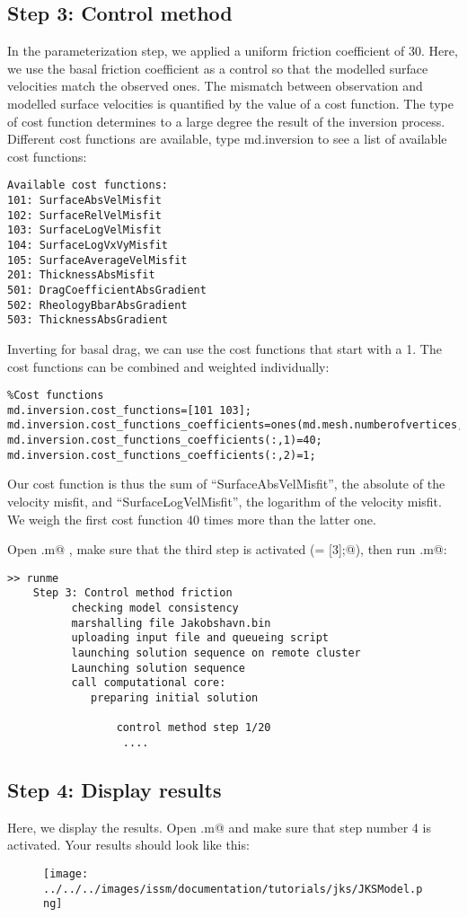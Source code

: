 \subsection{Step 3: Control method}
In the parameterization step, we applied a uniform friction coefficient of 30. Here, we use the basal friction coefficient as a control so that the modelled surface velocities
match the observed ones. The mismatch between observation and modelled surface velocities is quantified by the value of a
cost function. The type of cost function determines to a large degree the result of the inversion process. Different cost functions are available, type md.inversion to see a list of available cost functions:
\begin{verbatim}Available cost functions:
101: SurfaceAbsVelMisfit
102: SurfaceRelVelMisfit
103: SurfaceLogVelMisfit
104: SurfaceLogVxVyMisfit
105: SurfaceAverageVelMisfit
201: ThicknessAbsMisfit
501: DragCoefficientAbsGradient
502: RheologyBbarAbsGradient
503: ThicknessAbsGradient\end{verbatim}
Inverting for basal drag, we can use the cost functions that start with a 1. The cost functions can be combined and weighted individually:
\begin{verbatim}%Cost functions
md.inversion.cost_functions=[101 103];
md.inversion.cost_functions_coefficients=ones(md.mesh.numberofvertices,2);
md.inversion.cost_functions_coefficients(:,1)=40;
md.inversion.cost_functions_coefficients(:,2)=1;\end{verbatim}
Our cost function is thus the sum of ``SurfaceAbsVelMisfit'', the absolute of the velocity misfit, and ``SurfaceLogVelMisfit'', the logarithm of the velocity misfit. We weigh the first cost function 40 times more than the latter one.

Open \verb@runme.m@ , make sure that the third step is activated (\verb@steps = [3];@), then run \verb@runme.m@:
\begin{verbatim}>> runme
	Step 3: Control method friction
		  checking model consistency
		  marshalling file Jakobshavn.bin
		  uploading input file and queueing script
		  launching solution sequence on remote cluster
		  Launching solution sequence
		  call computational core:
		     preparing initial solution

			     control method step 1/20
				  ....\end{verbatim}

\subsection{Step 4: Display results}
Here, we display the results. Open \verb@runme.m@ and make sure that step number 4 is activated. Your results should look like this:
\begin{figure}[H]
	\begin{center}
		\texttt{[image: ../../../images/issm/documentation/tutorials/jks/JKSModel.png]}
	\end{center}
\end{figure}
